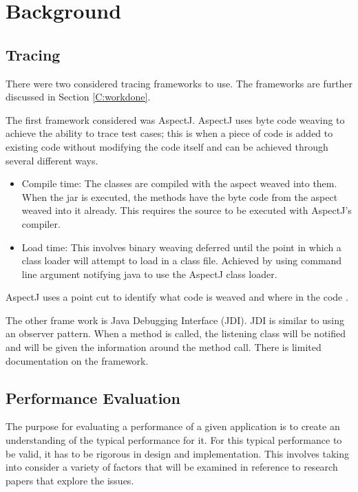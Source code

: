 \chapter{Background}\label{C:related}

\section{Tracing}

There were two considered tracing frameworks to use. The frameworks are further discussed in Section \ref{C:workdone}.

The first framework considered was AspectJ. AspectJ uses byte code weaving to achieve the ability to trace test cases; this is when a piece of code is added to existing code without modifying the code itself and can be achieved through several different ways.

\begin{itemize}
\item Compile time:
The classes are compiled with the aspect weaved into them. When the jar is executed, the methods have the byte code from the aspect weaved into it already. This requires the source to be executed with AspectJ's compiler.
\item Load time:
This involves binary weaving deferred until the point in which a class loader will attempt to load in a class file. Achieved by using command line argument notifying java to use the AspectJ class loader.
\end{itemize}

AspectJ uses a point cut to identify what code is weaved and where in the code \cite{aspectwiki}. 

The other frame work is Java Debugging Interface (JDI). JDI is similar to using an observer pattern. When a method is called, the listening class will be notified and will be given the information around the method call. There is limited documentation on the framework.

\section{Performance Evaluation}
\label{performanceEvalBG}
The purpose for evaluating a performance of a given application is to create an understanding of the typical performance for it. For this typical performance to be valid, it has to be rigorous in design and implementation. This involves taking into consider a variety of factors that will be examined in reference to research papers that explore the issues.


